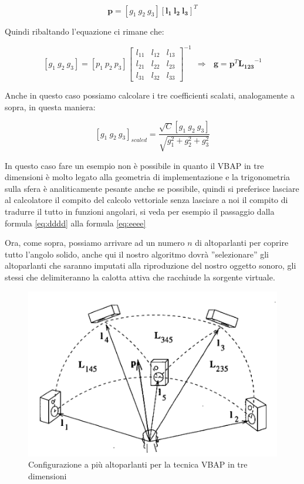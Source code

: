 \documentclass[12pt,a4paper]{report}
\begin{document}
\begin{equation}
\boldsymbol{p} = \left[ g_1 \ g_2 \ g_3 \right] \left[ \boldsymbol{l_{1}} \ \boldsymbol{l_{2}} \ \boldsymbol{l_{3}} \right]^T
\label{gggg}
\end{equation}

Quindi ribaltando l'equazione ci rimane che:

\begin{equation}
\left[g_1 \ g_2 \ g_3 \right] = \left[ p_1 \ p_2 \ p_3 \right]  {\left[\begin{matrix}
l_{11} & l_{12} & l_{13}\\ l_{21} & l_{22} & l_{23} \\ l_{31} & l_{32} & l_{33}
\end{matrix} \right]}^{-1} \ \ \Rightarrow \ \ \ \boldsymbol{g}=\boldsymbol{p}^T {\boldsymbol{L_{123}}}^{-1}
\label{hhhh}
\end{equation}

Anche in questo caso possiamo calcolare i tre coefficienti scalati, analogamente a sopra, in questa maniera:

\begin{equation}
\left[g_1 \ g_2 \ g_3 \right]_{scaled} = \dfrac{\sqrt{C} \left[ g_1 \ g_2 \ g_3 \right]}{\sqrt{g_1^2 + g_2^2 + g_3^2}}
\label{iiii}
\end{equation}

In questo caso fare un esempio non è possibile in quanto il VBAP in tre dimensioni è molto legato alla geometria di implementazione e la trigonometria sulla sfera è analiticamente pesante anche se possibile, quindi si preferisce lasciare al calcolatore il compito del calcolo vettoriale senza lasciare a noi il compito di tradurre il tutto in funzioni angolari, si veda per esempio il passaggio dalla formula \ref{eq:dddd} alla formula \ref{eq:eeee}

Ora, come sopra, possiamo arrivare ad un numero $n$ di altoparlanti per coprire tutto l'angolo solido, anche qui il nostro algoritmo dovrà ''selezionare'' gli altoparlanti che saranno imputati alla riproduzione del nostro oggetto sonoro, gli stessi che delimiteranno la calotta attiva che racchiude la sorgente virtuale.

\begin{figure}[htbp]
	\centering
	\includegraphics[scale=0.50 ]{figures/matrix3dfull.png}
	\caption {Configurazione a più altoparlanti per la tecnica VBAP in tre dimensioni}
	\label{fig:matrix3dfull}
	\end{figure}
\end{document}
